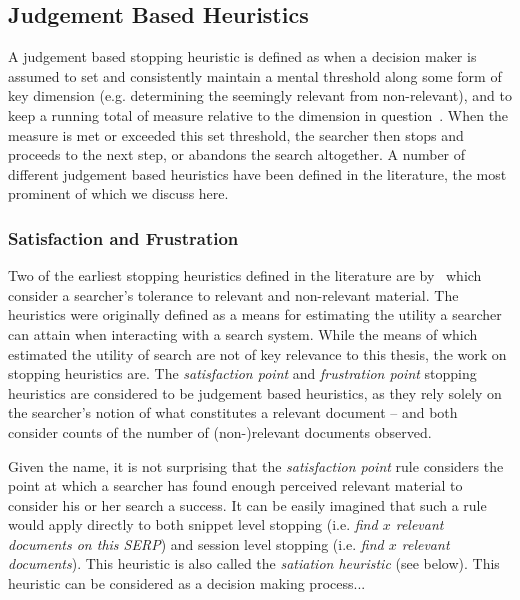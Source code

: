 \subsection{Judgement Based Heuristics}
A judgement based stopping heuristic is defined as when a decision maker is assumed to set and consistently maintain a mental threshold along some form of key dimension (e.g. determining the seemingly relevant from non-relevant), and to keep a running total of measure relative to the dimension in question~\citep{gettys1979hypothesis, nickles1995judgment}. When the measure is met or exceeded this set threshold, the searcher then stops and proceeds to the next step, or abandons the search altogether. A number of different judgement based heuristics have been defined in the literature, the most prominent of which we discuss here.

\subsubsection{Satisfaction and Frustration}\label{sec:stopping_background:heuristics:judgement:satisfaction_frustration}
Two of the earliest stopping heuristics defined in the literature are by~\cite{cooper1973retrieval_effectiveness_ii} which consider a searcher's tolerance to relevant and non-relevant material. The heuristics were originally defined as a means for estimating the utility a searcher can attain when interacting with a search system. While the means of which~\cite{cooper1973retrieval_effectiveness_ii} estimated the utility of search are not of key relevance to this thesis, the work on stopping heuristics are. The \emph{satisfaction point} and \emph{frustration point} stopping heuristics are considered to be judgement based heuristics, as they rely solely on the searcher's notion of what constitutes a relevant document -- and both consider counts of the number of (non-)relevant documents observed.

\noindent{}
Given the name, it is not surprising that the \emph{satisfaction point} rule considers the point at which a searcher has found enough perceived relevant material to consider his or her search a success. It can be easily imagined that such a rule would apply directly to both snippet level stopping (i.e. \emph{find $x$ relevant documents on this SERP}) and session level stopping (i.e. \emph{find $x$ relevant documents}). This heuristic is also called the \emph{satiation heuristic} (see below). This heuristic can be considered as a decision making process...

